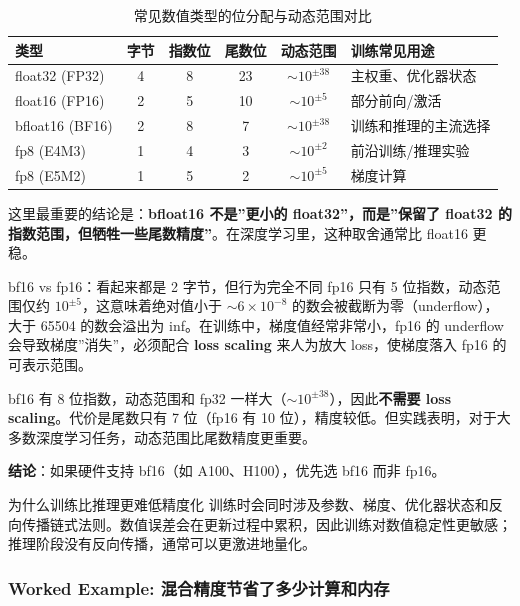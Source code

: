\begin{table}[H]
\centering
\begin{tabular}{lccccl}
\toprule
\textbf{类型} & \textbf{字节} & \textbf{指数位} & \textbf{尾数位} & \textbf{动态范围} & \textbf{训练常见用途} \\
\midrule
float32 (FP32) & 4 & 8 & 23 & $\sim 10^{\pm 38}$ & 主权重、优化器状态 \\
float16 (FP16) & 2 & 5 & 10 & $\sim 10^{\pm 5}$ & 部分前向/激活 \\
bfloat16 (BF16) & 2 & 8 & 7 & $\sim 10^{\pm 38}$ & 训练和推理的主流选择 \\
fp8 (E4M3) & 1 & 4 & 3 & $\sim 10^{\pm 2}$ & 前沿训练/推理实验 \\
fp8 (E5M2) & 1 & 5 & 2 & $\sim 10^{\pm 5}$ & 梯度计算 \\
\bottomrule
\end{tabular}
\caption{常见数值类型的位分配与动态范围对比}
\end{table}

这里最重要的结论是：\textbf{bfloat16 不是”更小的 float32”，而是”保留了 float32 的指数范围，但牺牲一些尾数精度”}。在深度学习里，这种取舍通常比 float16 更稳。

\begin{warningbox}{bf16 vs fp16：看起来都是 2 字节，但行为完全不同}
fp16 只有 5 位指数，动态范围仅约 $10^{\pm 5}$，这意味着绝对值小于 $\sim 6 \times 10^{-8}$ 的数会被截断为零（underflow），大于 65504 的数会溢出为 inf。在训练中，梯度值经常非常小，fp16 的 underflow 会导致梯度”消失”，必须配合 \textbf{loss scaling} 来人为放大 loss，使梯度落入 fp16 的可表示范围。

bf16 有 8 位指数，动态范围和 fp32 一样大（$\sim 10^{\pm 38}$），因此\textbf{不需要 loss scaling}。代价是尾数只有 7 位（fp16 有 10 位），精度较低。但实践表明，对于大多数深度学习任务，动态范围比尾数精度更重要。

\textbf{结论}：如果硬件支持 bf16（如 A100、H100），优先选 bf16 而非 fp16。
\end{warningbox}

\begin{importantbox}{为什么训练比推理更难低精度化}
训练时会同时涉及参数、梯度、优化器状态和反向传播链式法则。数值误差会在更新过程中累积，因此训练对数值稳定性更敏感；推理阶段没有反向传播，通常可以更激进地量化。
\end{importantbox}

\subsubsection{Worked Example: 混合精度节省了多少计算和内存}

